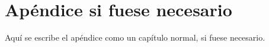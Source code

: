 \chapter{Ap\'endice si fuese necesario}

Aqu\'{i} se escribe el ap\'endice como un cap\'{i}tulo normal, si fuese necesario.